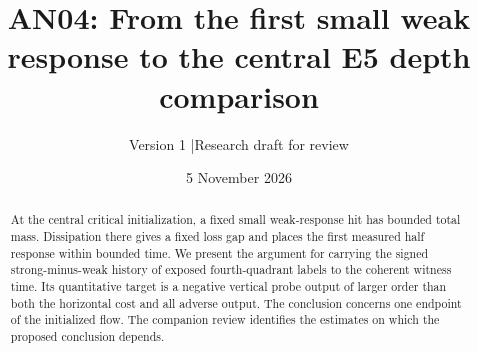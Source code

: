 \documentclass[11pt]{article}
\title{AN04: From the first small weak response to the central E5 depth comparison}
\author{Version 1 \quad|\quad Research draft for review}
\date{5 November 2026}
\begin{document}
\maketitle
\begin{abstract}
At the central critical initialization, a fixed small weak-response hit has bounded total mass.
Dissipation there gives a fixed loss gap and places the first measured half response within bounded time.
We present the argument for carrying the signed strong-minus-weak history of exposed fourth-quadrant labels to the coherent witness time. Its quantitative target is a negative vertical probe output of larger order than both the horizontal cost and all adverse output. The conclusion concerns one endpoint of the initialized flow. The companion review identifies the estimates on which the proposed conclusion depends.
\end{abstract}
\end{document}
